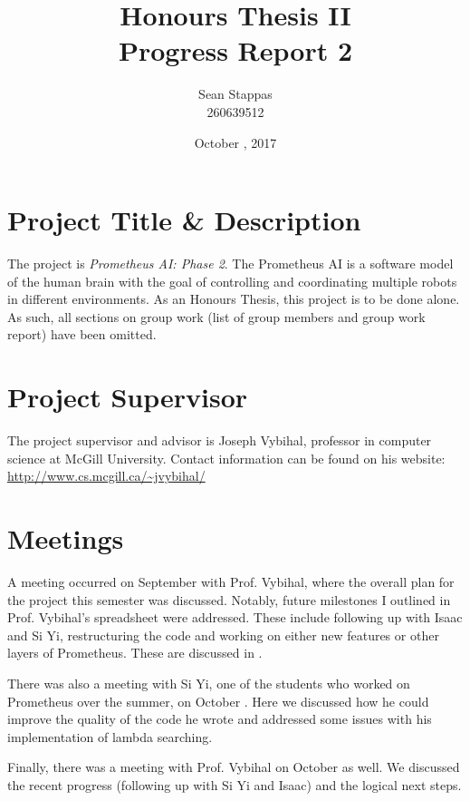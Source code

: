 \documentclass[]{article}
\title{\textbf{Honours Thesis II \\ Progress Report 2}}
\author{Sean Stappas \\ 260639512}
\date{October \nth{11}, 2017}
\begin{document}
	\maketitle
	
	\section{Project Title \& Description}
	
	The project is \emph{Prometheus AI: Phase 2}. The Prometheus AI is a software model of the human brain with the goal of controlling and coordinating multiple robots in different environments. As an Honours Thesis, this project is to be done alone. As such, all sections on group work (list of group members and group work report) have been omitted.
	
	\section{Project Supervisor}
	
	The project supervisor and advisor is Joseph Vybihal, professor in computer science at McGill University. Contact information can be found on his website: \url{http://www.cs.mcgill.ca/~jvybihal/}
	
	\section{Meetings}
	
	A meeting occurred on September  with Prof. Vybihal, where the overall plan for the project this semester was discussed. Notably, future milestones I outlined in Prof. Vybihal's spreadsheet were addressed. These include following up with Isaac and Si Yi, restructuring the code and working on either new features or other layers of Prometheus. These are discussed in .
	
	There was also a meeting with Si Yi, one of the students who worked on Prometheus over the summer, on October . Here we discussed how he could improve the quality of the code he wrote and addressed some issues with his implementation of lambda searching.
	
	Finally, there was a meeting with Prof. Vybihal on October  as well. We discussed the recent progress (following up with Si Yi and Isaac) and the logical next steps.
	
\end{document}
